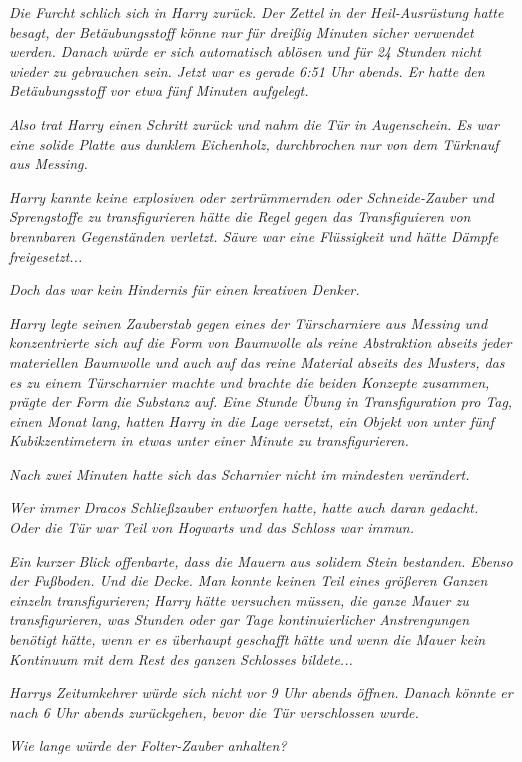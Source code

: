{\emph{Die Furcht schlich sich in Harry zurück. Der Zettel in der Heil-Ausrüstung hatte besagt, der Betäubungsstoff könne nur für dreißig Minuten sicher verwendet werden. Danach würde er sich automatisch ablösen und für 24 Stunden nicht wieder zu gebrauchen sein. Jetzt war es gerade 6:51 Uhr abends. Er hatte den Betäubungsstoff vor etwa fünf Minuten aufgelegt.}

\emph{Also trat Harry einen Schritt zurück und nahm die Tür in Augenschein. Es war eine solide Platte aus dunklem Eichenholz, durchbrochen nur von dem Türknauf aus Messing.}

\emph{Harry kannte keine explosiven oder zertrümmernden oder Schneide-Zauber und Sprengstoffe zu transfigurieren hätte die Regel gegen das Transfiguieren von brennbaren Gegenständen verletzt. Säure war eine Flüssigkeit und hätte Dämpfe freigesetzt...}

\emph{Doch das war kein Hindernis für einen} \emph{\emph{kreativen Denker.}}

\emph{Harry legte seinen Zauberstab gegen eines der Türscharniere aus Messing und konzentrierte sich auf die Form von Baumwolle als reine Abstraktion abseits jeder materiellen Baumwolle und auch auf das reine Material abseits des Musters, das es zu einem Türscharnier machte und brachte die beiden Konzepte zusammen, prägte der Form die Substanz auf. Eine Stunde Übung in Transfiguration pro Tag, einen Monat lang, hatten Harry in die Lage versetzt, ein Objekt von unter fünf Kubikzentimetern in etwas unter einer Minute zu transfigurieren.}

\emph{Nach zwei Minuten hatte sich das Scharnier nicht im mindesten verändert.}

\emph{Wer immer Dracos Schließzauber entworfen hatte, hatte auch daran gedacht. Oder die Tür war Teil von Hogwarts und das Schloss war immun.}

\emph{Ein kurzer Blick offenbarte, dass die Mauern aus solidem Stein bestanden. Ebenso der Fußboden. Und die Decke. Man konnte keinen Teil eines größeren Ganzen einzeln transfigurieren; Harry hätte versuchen müssen, die ganze Mauer zu transfigurieren, was Stunden oder gar Tage kontinuierlicher Anstrengungen benötigt hätte, wenn er es überhaupt geschafft hätte und wenn die Mauer kein Kontinuum mit dem Rest des ganzen Schlosses bildete...}

\emph{Harrys Zeitumkehrer würde sich nicht vor 9 Uhr abends öffnen. Danach könnte er nach 6 Uhr abends zurückgehen, bevor die Tür verschlossen wurde.}

\emph{Wie lange würde der Folter-Zauber anhalten?}

}
